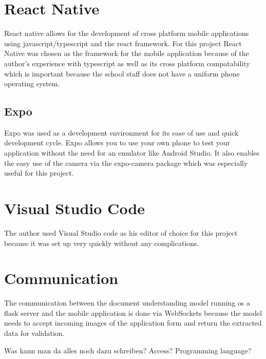 



\section{React Native}
React native allows for the development of cross platform mobile applications using javascript/typescript and the react framework.
For this project React Native was chosen as the framework for the mobile application
because of the author's experience with typescript as well as its cross platform compatability
which is important because the school staff does not have a uniform phone operating system.

\subsection{Expo}
Expo was used as a development environment for its ease of use and quick development cycle.
Expo allows you to use your own phone to test your application without the need for an emulator like Android Studio.
It also enables the easy use of the camera via the expo-camera package which was especially useful for this project.

\section{Visual Studio Code}
The author used Visual Studio code as his editor of choice for this project because it was set up very quickly without any complications.

\section{Communication}
The communication between the document understanding model running os a flask server and the mobile application is done via WebSockets
because the model needs to accept incoming images of the application form and return the extracted data for validation.

Was kann man da alles noch dazu schreiben? Access? Programming language?